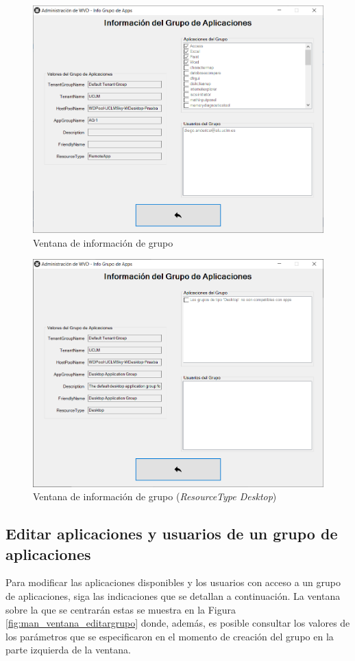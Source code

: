 \begin{figure}[h]
  \centering
  \includegraphics[width=0.8\linewidth]{figures/images/script/ventana_infogrupo.PNG}
  \caption{Ventana de información de grupo}
  \label{fig:man_ventana_infogrupo}
\end{figure}

\begin{figure}[h]
  \centering
  \includegraphics[width=0.8\linewidth]{figures/images/script/ventana_infogrupoDesktop.PNG}
  \caption{Ventana de información de grupo (\textit{ResourceType Desktop})}
  \label{fig:man_ventana_infogrupoDesktop}
\end{figure}

\clearpage

\subsection{Editar aplicaciones y usuarios de un grupo de aplicaciones}
Para modificar las aplicaciones disponibles y los usuarios con acceso a un grupo de aplicaciones, siga las indicaciones que se detallan a continuación. La ventana sobre la que se centrarán estas se muestra en la Figura \ref{fig:man_ventana_editargrupo} donde, además, es posible consultar los valores de los parámetros que se especificaron en el momento de creación del grupo en la parte izquierda de la ventana.

